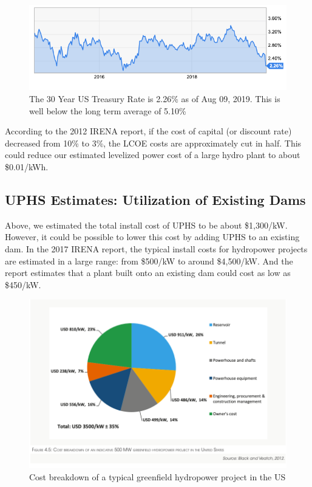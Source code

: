 \documentclass[hidelinks,12pt,a4paper]{article}
\begin{document}
\begin{figure}[ht!]
    \centering
    \includegraphics[width=1\textwidth]{30-year-treasury-rate-226-for-aug-09-2019.png}
    \caption{The 30 Year US Treasury Rate is 2.26\% as of Aug 09, 2019. This is well below the long term average of 5.10\% \cite{30YearTreasuryRateUS}}
\end{figure}
\FloatBarrier

According to the 2012 IRENA report, if the cost of capital (or discount rate) decreased from 10\% to 3\%, the LCOE costs are approximately cut in half. \cite{RenewableEnergyTechnologiesCostAnalysisSeries} This could reduce our estimated levelized power cost of a large hydro plant to about \$0.01/kWh.

\subsection{UPHS Estimates: Utilization of Existing Dams}
Above, we estimated the total install cost of UPHS to be about \$1,300/kW. However, it could be possible to lower this cost by adding UPHS to an existing dam. In the 2017 IRENA report, the typical install costs for hydropower projects are estimated in a large range: from \$500/kW to around \$4,500/kW. And the report estimates that a plant built onto an existing dam could cost as low as \$450/kW.

\begin{figure}[ht!]
    \centering
    \includegraphics[width=1\textwidth]{cost-breakdown-of-typical-hydro-plant.png}
    \caption{Cost breakdown of a typical greenfield hydropower project in the US \cite{RenewableEnergyTechnologiesCostAnalysisSeries}}
\end{figure}
\FloatBarrier
\end{document}
